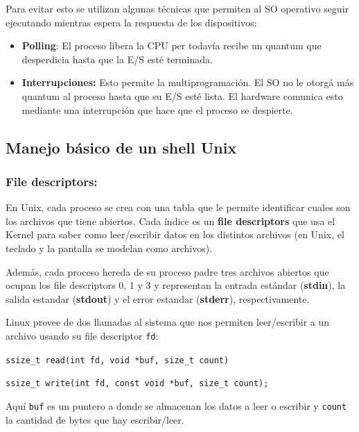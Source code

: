 	Para evitar esto se utilizan algunas técnicas que permiten al SO operativo seguir ejecutando mientras espera la respuesta de los dispositivos:

	\begin{itemize}
		\item \textbf{Polling}: El proceso libera la CPU per todavía recibe un quantum que desperdicia hasta que la E/S esté terminada.
		\item \textbf{Interrupciones:} Esto permite la multiprogramación. El SO no le otorgá más quantum al proceso hasta que su E/S esté lista. El hardware comunica esto mediante una interrupción que hace que el proceso se despierte.
	\end{itemize}

	\subsection{Manejo básico de un shell Unix}
\subsubsection{File descriptors:}
	En Unix, cada proceso se crea con una tabla que le permite identificar cuales son los archivos que tiene abiertos. Cada índice es un \textbf{file descriptors} que usa el Kernel para saber como leer/escribir datos en los distintos archivos (en Unix, el teclado y la pantalla se modelan como archivos).
	
	Además, cada proceso hereda de su proceso padre tres archivos abiertos que ocupan los file descriptors 0, 1 y 3 y representan la entrada estándar (\textbf{stdin}), la salida estandar (\textbf{stdout}) y el error estandar (\textbf{stderr}), respectivamente.
	
	Linux provee de dos llamadas al sistema que nos permiten leer/escribir a un archivo usando su file descriptor \texttt{fd}:
	
	\begin{center}
		\texttt{ssize\_t read(int fd, void *buf, size\_t count)}

		\texttt{ssize\_t write(int fd, const void *buf, size\_t count);}
	\end{center}
	
Aquí \texttt{buf} es un puntero a donde se almacenan los datos a leer o escribir y \texttt{count} la cantidad de bytes que hay escribir/leer.

